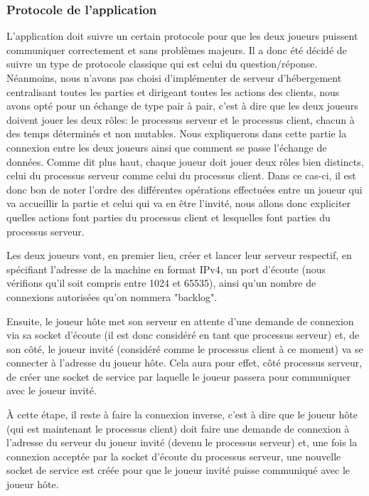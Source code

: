 	\subsubsection{Protocole de l'application}
		L'application doit suivre un certain protocole pour que les deux joueurs puissent communiquer correctement et sans problèmes majeurs. Il a donc été décidé de suivre un type de protocole classique qui est celui du question/réponse. Néanmoins, nous n'avons pas choisi d'implémenter de serveur d'hébergement centralisant toutes les parties et dirigeant toutes les actions des clients, nous avons opté pour un échange de type pair à pair, c'est à dire que les deux joueurs doivent jouer les deux rôles: le processus serveur et le processus client, chacun à des temps déterminés et non mutables. \newline
		Nous expliquerons dans cette partie la connexion entre les deux joueurs ainsi que comment se passe l'échange de données.
			Comme dit plus haut, chaque joueur doit jouer deux rôles bien distincts, celui du processus serveur comme celui du processus client. Dans ce cas-ci, il est donc bon de noter l'ordre des différentes opérations effectuées entre un joueur qui va accueillir la partie et celui qui va en être l'invité, nous allons donc expliciter quelles actions font parties du processus client et lesquelles font parties du processus serveur. \newline
			
			Les deux joueurs vont, en premier lieu, créer et lancer leur serveur respectif, en spécifiant l'adresse de la machine en format IPv4, un port d'écoute (nous vérifions qu'il soit compris entre 1024 et 65535), ainsi qu'un nombre de connexions autorisées qu'on nommera "backlog". \newline
			
			Ensuite, le joueur hôte met son serveur en attente d'une demande de connexion via sa socket d'écoute (il est donc considéré en tant que processus serveur) et, de son côté, le joueur invité (considéré comme le processus client à ce moment) va se connecter à l'adresse du joueur hôte. Cela aura pour effet, côté processus serveur, de créer une socket de service par laquelle le joueur passera pour communiquer avec le joueur invité. \newline
			
			À cette étape, il reste à faire la connexion inverse, c'est à dire que le joueur hôte (qui est maintenant le processus client) doit faire une demande de connexion à l'adresse du serveur du joueur invité (devenu le processus serveur) et, une fois la connexion acceptée par la socket d'écoute du processus serveur, une nouvelle socket de service est créée pour que le joueur invité puisse communiqué avec le joueur hôte.\newline
			
